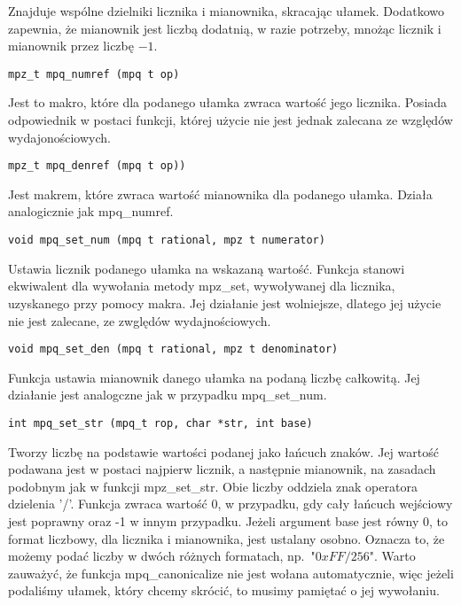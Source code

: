 \documentclass[twoside,a4paper]{book}
\begin{document}
Znajduje wspólne dzielniki licznika i mianownika, skracając ułamek. Dodatkowo zapewnia, że mianownik jest liczbą dodatnią, w razie potrzeby, mnożąc licznik i mianownik przez liczbę $-1$.

\begin{lstlisting}
mpz_t mpq_numref (mpq t op)
\end{lstlisting}

Jest to makro, które dla podanego ułamka zwraca wartość jego licznika. Posiada odpowiednik w postaci funkcji, której użycie nie jest jednak zalecana ze względów wydajonościowych.

\begin{lstlisting}
mpz_t mpq_denref (mpq t op))
\end{lstlisting}

Jest makrem, które zwraca wartość mianownika dla podanego ułamka. Działa analogicznie jak mpq\_numref.

\begin{lstlisting}
void mpq_set_num (mpq t rational, mpz t numerator)
\end{lstlisting}

Ustawia licznik podanego ułamka na wskazaną wartość. Funkcja stanowi ekwiwalent dla wywołania metody mpz\_set, wywoływanej dla licznika, uzyskanego przy pomocy makra. Jej działanie jest wolniejsze, dlatego jej użycie nie jest zalecane, ze zwględów wydajnościowych.

\begin{lstlisting}
void mpq_set_den (mpq t rational, mpz t denominator)
\end{lstlisting}
Funkcja ustawia mianownik danego ułamka na podaną liczbę całkowitą. Jej działanie jest analogczne jak w przypadku mpq\_set\_num.

\begin{lstlisting}
int mpq_set_str (mpq_t rop, char *str, int base)
\end{lstlisting}

Tworzy liczbę na podstawie wartości podanej jako łańcuch znaków. Jej wartość podawana jest w postaci najpierw licznik, a następnie mianownik, na zasadach podobnym jak w funkcji mpz\_set\_str. Obie liczby oddziela znak operatora dzielenia '/'. Funkcja zwraca wartość $0$, w przypadku, gdy cały łańcuch wejściowy jest poprawny oraz -1 w innym przypadku. Jeżeli argument base jest równy $0$, to format liczbowy, dla licznika i mianownika, jest ustalany osobno. Oznacza to, że możemy podać liczby w dwóch różnych formatach, np.\ "$0xFF/256$". Warto zauważyć, że funkcja mpq\_canonicalize nie jest wołana automatycznie, więc jeżeli podaliśmy ułamek, który chcemy skrócić, to musimy pamiętać o jej wywołaniu.
\end{document}
